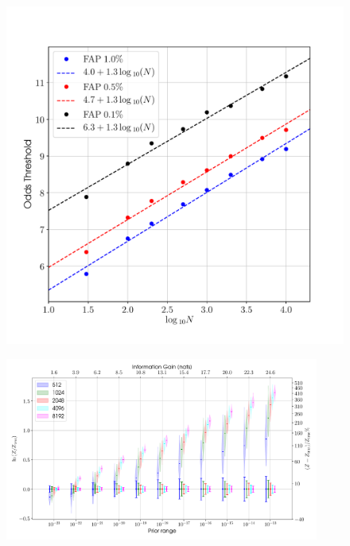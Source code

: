 \begin{figure}[!phtb]
\begin{center}
\includegraphics[width=1\columnwidth]{./figures/changepoint/changepoint}
\caption{ \protect}
\end{center}
\end{figure}



\begin{figure}[phtb]
\begin{center}
\includegraphics[width=0.92\textwidth]{./figures/proptesting/walk_prop/evidences/collate_plots_wp_evidences}
\caption{ \protect}
\end{center}
\end{figure}


